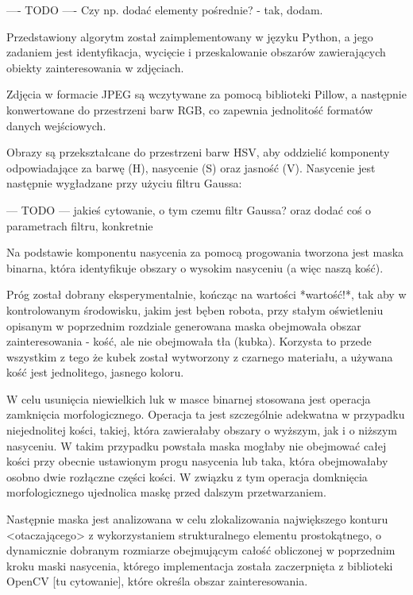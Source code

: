 ---- TODO ---- Czy np. dodać elementy pośrednie? - tak, dodam.


Przedstawiony algorytm został zaimplementowany w języku Python, a jego zadaniem jest identyfikacja, wycięcie i przeskalowanie obszarów zawierających obiekty zainteresowania w zdjęciach.

Zdjęcia w formacie JPEG są wczytywane za pomocą biblioteki Pillow, a następnie konwertowane do przestrzeni barw RGB, co zapewnia jednolitość formatów danych wejściowych.

Obrazy są przekształcane do przestrzeni barw HSV, aby oddzielić komponenty odpowiadające za barwę (H), nasycenie (S) oraz jasność (V).
Nasycenie jest następnie wygładzane przy użyciu filtru Gaussa:

--- TODO ---
jakieś cytowanie, o tym czemu filtr Gaussa?
oraz dodać coś o parametrach filtru, konkretnie

Na podstawie komponentu nasycenia za pomocą progowania tworzona jest maska binarna,
która identyfikuje obszary o wysokim nasyceniu (a więc naszą kość).

Próg został dobrany eksperymentalnie, kończąc na wartości *wartość!*, tak aby w kontrolowanym środowisku, jakim jest bęben robota,
przy stałym oświetleniu opisanym w poprzednim rozdziale generowana maska obejmowała obszar zainteresowania - kość, ale nie obejmowała tła (kubka).
Korzysta to przede wszystkim z tego że kubek został wytworzony z czarnego materiału, a używana kość jest jednolitego, jasnego koloru.

W celu usunięcia niewielkich luk w masce binarnej stosowana jest operacja zamknięcia morfologicznego.
Operacja ta jest szczególnie adekwatna w przypadku niejednolitej kości, takiej,
która zawierałaby obszary o wyższym, jak i o niższym nasyceniu.
W takim przypadku powstała maska mogłaby nie obejmować całej kości przy obecnie ustawionym progu nasycenia lub taka,
która obejmowałaby osobno dwie rozłączne części kości.
W związku z tym operacja domknięcia morfologicznego ujednolica maskę przed dalszym przetwarzaniem.


Następnie maska jest analizowana w celu zlokalizowania największego konturu <otaczającego> z wykorzystaniem strukturalnego elementu prostokątnego,
o dynamicznie dobranym rozmiarze obejmującym całość obliczonej w poprzednim kroku maski nasycenia,
którego implementacja została zaczerpnięta z biblioteki OpenCV [tu cytowanie], które określa obszar zainteresowania.

